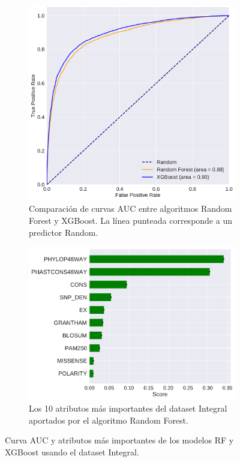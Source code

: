 




\newpage

\begin{figure}[H]
\centering
\begin{subfigure}[t]{0.7\textwidth}
    \centering
    \includegraphics[width=\textwidth]{documents/latex/figures/3/integral/auc_integral.pdf}
    \caption{Comparación de curvas AUC entre algoritmos Random Forest y XGBoost. La línea punteada corresponde a un predictor Random.}
    \label{fig:auc_integral}
\end{subfigure}
\hfill
\hfill
\begin{subfigure}[b]{0.7\textwidth}
    \centering
    \includegraphics[width=\textwidth]{documents/latex/figures/3/integral/importances_integral.pdf}
    \caption{Los 10 atributos más importantes del dataset Integral aportados por el algoritmo Random Forest.}
    \label{fig:importances_integral_rf}
\end{subfigure}

\caption{Curva AUC y atributos más importantes de los modelos RF y XGBoost usando el dataset Integral.}

\end{figure}
